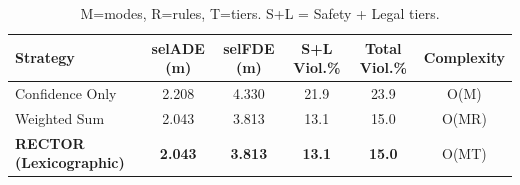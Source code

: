 \begin{table}[t]
\centering
\caption{Selection Strategy Comparison}
\label{tab:selection_strategy}
\begin{tabular}{lccccc}
\toprule
\textbf{Strategy} & \textbf{selADE (m)} & \textbf{selFDE (m)} & \textbf{S+L Viol.\%} & \textbf{Total Viol.\%} & \textbf{Complexity} \\
\midrule
Confidence Only & 2.208 & 4.330 & 21.9 & 23.9 & O(M) \\
Weighted Sum & 2.043 & 3.813 & 13.1 & 15.0 & O(MR) \\
\textbf{RECTOR (Lexicographic)} & \textbf{2.043} & \textbf{3.813} & \textbf{13.1} & \textbf{15.0} & O(MT) \\
\bottomrule
\end{tabular}
\vspace{1mm}
\caption*{\footnotesize M=modes, R=rules, T=tiers. S+L = Safety + Legal tiers.}
\end{table}
